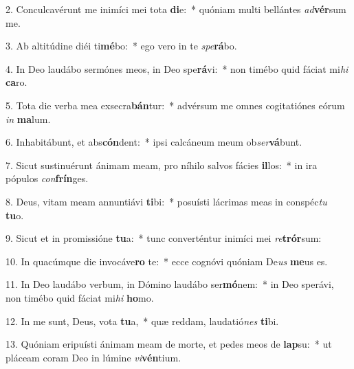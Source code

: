 2. Conculcavérunt me inimíci mei tota \textbf{di}e:~*  quóniam multi bellántes \textit{ad}\textbf{vér}sum me.\

3. Ab altitúdine diéi ti\textbf{mé}bo:~*  ego vero in te \textit{spe}\textbf{rá}bo.\

4. In Deo laudábo sermónes meos, in Deo spe\textbf{rá}vi:~*  non timébo quid fáciat mi\textit{hi} \textbf{ca}ro.\

5. Tota die verba mea exsecra\textbf{bán}tur:~*  advérsum me omnes cogitatiónes eórum \textit{in} \textbf{ma}lum.\

6. Inhabitábunt, et abs\textbf{cón}dent:~*  ipsi calcáneum meum ob\textit{ser}\textbf{vá}bunt.\

7. Sicut sustinuérunt ánimam meam, pro níhilo salvos fácies \textbf{il}los:~*  in ira pópulos \textit{con}\textbf{frín}ges.\

8. Deus, vitam meam annuntiávi \textbf{ti}bi:~*  posuísti lácrimas meas in conspéc\textit{tu} \textbf{tu}o.\

9. Sicut et in promissióne \textbf{tu}a:~*  tunc converténtur inimíci mei \textit{re}\textbf{trór}sum:\

10. In quacúmque die invocáve\textbf{ro} te:~*  ecce cognóvi quóniam De\textit{us} \textbf{me}us es.\

11. In Deo laudábo verbum, in Dómino laudábo ser\textbf{mó}nem:~*  in Deo sperávi, non timébo quid fáciat mi\textit{hi} \textbf{ho}mo.\

12. In me sunt, Deus, vota \textbf{tu}a,~*  quæ reddam, laudatió\textit{nes} \textbf{ti}bi.\

13. Quóniam eripuísti ánimam meam de morte, et pedes meos de \textbf{lap}su:~*  ut pláceam coram Deo in lúmine \textit{vi}\textbf{vén}tium.\

